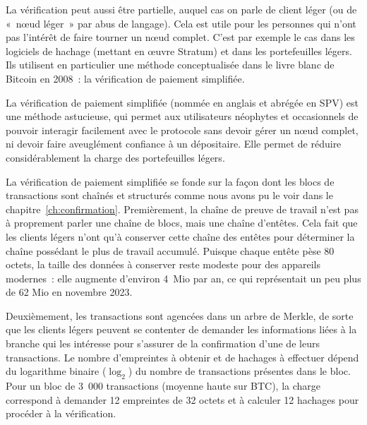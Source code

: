 La vérification peut aussi être partielle, auquel cas on parle de client léger (ou de «~nœud léger~» par abus de langage). Cela est utile pour les personnes qui n'ont pas l'intérêt de faire tourner un nœud complet. C'est par exemple le cas dans les logiciels de hachage (mettant en œuvre Stratum) et dans les portefeuilles légers. Ils utilisent en particulier une méthode conceptualisée dans le livre blanc de Bitcoin en 2008~: la vérification de paiement simplifiée.

La vérification de paiement simplifiée (nommée en anglais  et abrégée en SPV) est une méthode astucieuse, qui permet aux utilisateurs néophytes et occasionnels de pouvoir interagir facilement avec le protocole sans devoir gérer un nœud complet, ni devoir faire aveuglément confiance à un dépositaire. Elle permet de réduire considérablement la charge des portefeuilles légers.  %

La vérification de paiement simplifiée se fonde sur la façon dont les blocs de transactions sont chaînés et structurés comme nous avons pu le voir dans le chapitre~\ref{ch:confirmation}. Premièrement, la chaîne de preuve de travail n'est pas à proprement parler une chaîne de blocs, mais une chaîne d'entêtes. Cela fait que les clients légers n'ont qu'à conserver cette chaîne des entêtes pour déterminer la chaîne possédant le plus de travail accumulé. Puisque chaque entête pèse 80 octets, la taille des données à conserver reste modeste pour des appareils modernes~: elle augmente d'environ 4~Mio par an, ce qui représentait un peu plus de 62 Mio en novembre 2023.

Deuxièmement, les transactions sont agencées dans un arbre de Merkle, de sorte que les clients légers peuvent se contenter de demander les informations liées à la branche qui les intéresse pour s'assurer de la confirmation d'une de leurs transactions. Le nombre d'empreintes à obtenir et de hachages à effectuer dépend du logarithme binaire ($\log_{2}$) du nombre de transactions présentes dans le bloc. Pour un bloc de 3~000 transactions (moyenne haute sur BTC), la charge correspond à demander 12 empreintes de 32 octets et à calculer 12 hachages pour procéder à la vérification.

